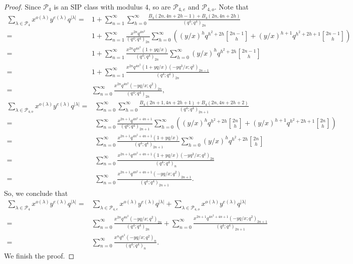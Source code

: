 \documentclass[10pt,a4paper]{amsart}
\begin{document}
\begin{proof}
Since $\mathcal{P}_4$ is an SIP class with modulus $4$, so are $\mathcal{P}_{4,e}$ and $\mathcal{P}_{4,o}$. Note that
\begin{align*}\label{eq}
\sum_{\lambda\in\mathcal{P}_4}x^{o(\lambda)}y^{e(\lambda)}q^{|\lambda|}=&1+\sum_{n=1}^{\infty}\sum_{h=0}^{\infty}\frac{B_4(2n,4n+2h-1)+B_4(2n,4n+2h)}{(q^4;q^4)_{2n}}\\
=&1+\sum_{n=1}^{\infty}\frac{x^{2n}q^{4n^2}}{(q^4;q^4)_{2n}}\sum_{h=0}^{\infty}\left((y/x)^{h}q^{h^2+2h}{2n-1\brack h}+(y/x)^{h+1}q^{h^2+2h+1}{2n-1\brack h}\right)\\
=&1+\sum_{n=1}^{\infty}\frac{x^{2n}q^{4n^2}(1+yq/x)}{(q^4;q^4)_{2n}}\sum_{h=0}^{\infty}(y/x)^hq^{h^2+2h}{2n-1\brack h}\\
=&1+\sum_{n=1}^{\infty}\frac{x^{2n}q^{4n^2}(1+yq/x)(-yq^3/x;q^2)_{2n-1}}{(q^4;q^4)_{2n}}\\
=&\sum_{n=0}^{\infty}\frac{x^{2n}q^{4n^2}(-yq/x;q^2)_{2n}}{(q^4;q^4)_{2n}},
\end{align*}
\begin{align*}
\sum_{\lambda\in\mathcal{P}_{4,o}}x^{o(\lambda)}y^{e(\lambda)}q^{|\lambda|}=&\sum_{n=0}^{\infty}\sum_{h=0}^{\infty}\frac{B_4(2n+1,4n+2h+1)+B_4(2n,4n+2h+2)}{(q^4;q^4)_{2n+1}}\\
=&\sum_{n=0}^{\infty}\frac{x^{2n+1}q^{4n^2+4n+1}}{(q^4;q^4)_{2n+1}}\sum_{h=0}^{\infty}\left((y/x)^{h}q^{h^2+2h}{2n\brack h}+(y/x)^{h+1}q^{h^2+2h+1}{2n\brack h}\right)\\
=&\sum_{n=0}^{\infty}\frac{x^{2n+1}q^{4n^2+4n+1}(1+yq/x)}{(q^4;q^4)_{2n+1}}\sum_{h=0}^{\infty}(y/x)^hq^{h^2+2h}{2n\brack h}\\
=&\sum_{n=0}^{\infty}\frac{x^{2n+1}q^{4n^2+4n+1}(1+yq/x)(-yq^3/x;q^2)_{2n}}{(q^4;q^4)_{n}}\\
=&\sum_{n=0}^{\infty}\frac{x^{2n+1}q^{4n^2+4n+1}(-yq/x;q^2)_{2n+1}}{(q^4;q^4)_{2n+1}}.
\end{align*}
So, we conclude that
\begin{align*}
\sum_{\lambda\in\mathcal{P}_4}x^{o(\lambda)}y^{e(\lambda)}q^{|\lambda|}=&\sum_{\lambda\in\mathcal{P}_{4,e}}x^{o(\lambda)}y^{e(\lambda)}q^{|\lambda|}+\sum_{\lambda\in\mathcal{P}_{4,o}}x^{o(\lambda)}y^{e(\lambda)}q^{|\lambda|}\\
=&\sum_{n=0}^{\infty}\frac{x^{2n}q^{4n^2}(-yq/x;q^2)_{2n}}{(q^4;q^4)_{2n}}+\sum_{n=0}^{\infty}\frac{x^{2n+1}q^{4n^2+4n+1}(-yq/x;q^2)_{2n+1}}{(q^4;q^4)_{2n+1}}\\
=&\sum_{n=0}^{\infty}\frac{x^nq^{n^2}(-yq/x;q^2)_{n}}{(q^4;q^4)_{n}}.
\end{align*}
We finish the proof. 
\end{proof}
\end{document}
